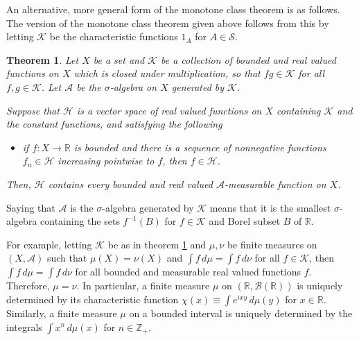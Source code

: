 \documentclass[12pt]{article}
\newtheorem{theorem}{Theorem}
\begin{document}
An alternative, more general form of the monotone class theorem is as follows. The version of the monotone class theorem given above follows from this by letting $\mathcal{K}$ be the characteristic functions $1_A$ for $A\in\mathcal{S}$.

\begin{theorem}\label{thm:2}
Let $X$ be a set and $\mathcal{K}$ be a collection of bounded and real valued functions on $X$ which is closed under multiplication, so that $fg\in\mathcal{K}$ for all $f,g\in\mathcal{K}$. Let $\mathcal{A}$ be the $\sigma$-algebra on $X$ generated by $\mathcal{K}$.

Suppose that $\mathcal{H}$ is a vector space of real valued functions on $X$ containing $\mathcal{K}$ and the constant functions, and satisfying the following
\begin{itemize}
\item if $f\colon X\rightarrow\mathbb{R}$ is bounded and there is a sequence of nonnegative functions $f_n\in \mathcal{H}$ increasing pointwise to $f$, then $f\in \mathcal{H}$.
\end{itemize}
Then, $\mathcal{H}$ contains every bounded and real valued $\mathcal{A}$-measurable function on $X$.
\end{theorem}

Saying that $\mathcal{A}$ is the $\sigma$-algebra generated by $\mathcal{K}$ means that it is the smallest $\sigma$-algebra containing the sets $f^{-1}(B)$ for $f\in\mathcal{K}$ and Borel subset $B$ of $\mathbb{R}$.

For example, letting $\mathcal{K}$ be as in theorem \ref{thm:2} and $\mu,\nu$ be finite measures on $(X,\mathcal{A})$ such that $\mu(X)=\nu(X)$ and $\int f\,d\mu=\int f\,d\nu$ for all $f\in\mathcal{K}$, then $\int f\,d\mu=\int f\,d\nu$ for all bounded and measurable real valued functions $f$. Therefore, $\mu=\nu$. In particular, a finite measure $\mu$ on $(\mathbb{R},\mathcal{B}(\mathbb{R}))$ is uniquely determined by its characteristic function $\chi(x)\equiv\int e^{ixy}\,d\mu(y)$ for $x\in\mathbb{R}$.
Similarly, a finite measure $\mu$ on a bounded interval is uniquely determined by the integrals $\int x^{n}\,d\mu(x)$ for $n\in\mathbb{Z}_+$.

\end{document}
